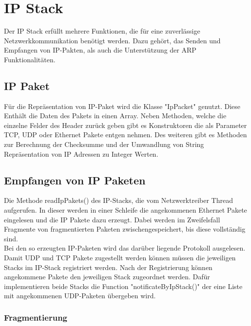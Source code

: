 \section{IP Stack}
Der IP Stack erfüllt mehrere Funktionen, die für eine zuverlässige Netzwerkkommunikation benötigt werden. Dazu gehört, das Senden und Empfangen von IP-Pakten, als auch die Unterstützung der ARP Funktionalitäten.

\subsection{IP Paket}
Für die Repräsentation von IP-Paket wird die Klasse "IpPacket" genutzt. Diese Enthält die Daten des Pakets in einen Array. Neben Methoden, welche die einzelne Felder des Header zurück geben gibt es Konstruktoren die als Parameter TCP, UDP oder Ethernet Pakete entgen nehmen. Des  weiteren gibt es Methoden zur Berechnung der Checksumme und der Umwandlung von String Repräsentation von IP Adressen zu Integer Werten.  

\subsection{Empfangen von IP Paketen}

Die Methode readIpPakets() des IP-Stacks, die vom Netzwerktreiber Thread aufgerufen. In dieser werden in einer Schleife die angekommenen Ethernet Pakete eingelesen und die IP Pakete dazu erzeugt. Dabei werden im Zweifelsfall Fragmente von fragmentierten Paketen zwischengespeichert, bis diese vollständig sind. \\
Bei den so erzeugten IP-Paketen wird das darüber liegende Protokoll ausgelesen.\\
Damit UDP und TCP Pakete zugestellt werden können müssen die jeweiligen Stacks im IP-Stack registriert werden. Nach der Registrierung können angekommene  Pakete den jeweiligen Stack zugeordnet werden. Dafür implementieren beide Stacks die Function "notificateByIpStack()" der eine Liste mit angekommenen UDP-Paketen übergeben wird. 

\subsubsection{Fragmentierung}

